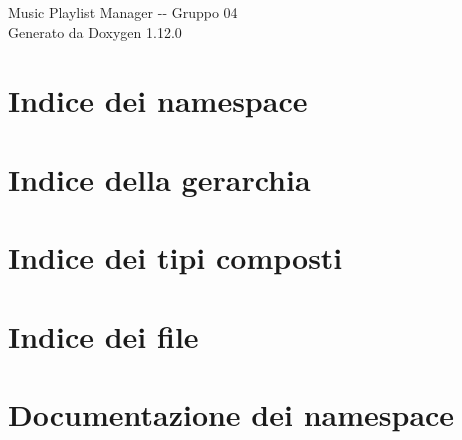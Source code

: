 \documentclass[twoside]{book}
\newcommand{\+}{\discretionary{\mbox{\scriptsize$\hookleftarrow$}}{}{}}
\newcommand{\clearemptydoublepage}{%
    \newpage{\pagestyle{empty}\cleardoublepage}%
  }
\begin{document}
  \raggedbottom
    \hypersetup{pageanchor=false,
                bookmarksnumbered=true,
                pdfencoding=unicode
               }
  \begin{titlepage}
  \vspace*{7cm}
  \begin{center}%
  {\Large Music Playlist Manager -\/-\/ Gruppo 04}\\
  \vspace*{1cm}
  {\large Generato da Doxygen 1.12.0}\\
  \end{center}
  \end{titlepage}
  \clearemptydoublepage
  \tableofcontents
  \clearemptydoublepage
  \hypersetup{pageanchor=true}
\chapter{Indice dei namespace}

\chapter{Indice della gerarchia}

\chapter{Indice dei tipi composti}

\chapter{Indice dei file}

\chapter{Documentazione dei namespace}












\end{document}
